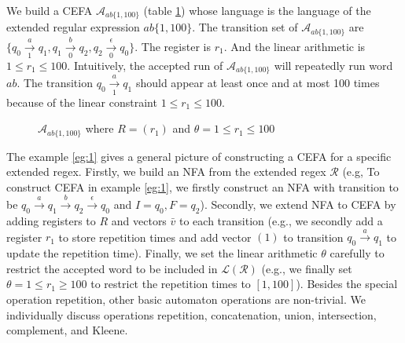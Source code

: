 \documentclass[sigconf]{acmart}
\newcommand*{\regex}{\mathcal{R}}
\newcommand*{\lan}{\mathcal{L}}
\newcommand*{\aut}{\mathcal{A}}
\begin{document}
\begin{example}[The CEFA  $\aut_{ab\{1,100\}}$ ] \label{eg:1}
  We build a CEFA $\aut_{ab\{1,100\}}$ (table \ref{fig:cefa1}) whose language is the language of the extended regular expression $ab\{1,100\}$. The transition set of $\aut_{ab\{1,100\}}$ are $\{q_0\xrightarrow[1]{a} q_1, q_1 \xrightarrow[0]{b} q_2, q_2 \xrightarrow[0]{\epsilon} q_0\}$. The register is $r_1$. And the linear arithmetic is $1\leq r_1\leq 100$. Intuitively, the accepted run of $\aut_{ab\{1,100\}}$ will repeatedly run word $ab$. The transition $q_0\xrightarrow[1]{a} q_1$ should appear at least once and at most 100 times because of the linear constraint $1\leq r_1 \leq 100$.
  \begin{figure}[h]
    \caption{$\aut_{ab\{1,100\}}$ where $R=(r_1)$ and $\theta = 1\leq r_1 \leq 100$}
    \label{fig:cefa1}
  \end{figure}
\end{example}
The example \ref{eg:1} gives a general picture of constructing a CEFA for a specific extended regex. Firstly, we build an NFA from the extended regex $\regex$
(e.g, To construct CEFA in example \ref{eg:1}, we firstly construct an NFA with
transition to be $q_0\xrightarrow{a} q_1\xrightarrow{b}q_2\xrightarrow{\epsilon}
  q_0$ and $I={q_0}, F={q_2}$). Secondly, we extend NFA to CEFA by adding
registers to $R$ and vectors $\bar{v}$ to each transition (e.g., we secondly add a
register $r_1$ to store repetition times and add vector $(1)$ to transition
$q_0\xrightarrow{a}q_1$ to update the repetition time). Finally, we set the
linear arithmetic $\theta$ carefully to restrict the accepted word to be
included in $\lan(\regex)$ (e.g., we finally set $\theta = 1\leq r_1\geq 100$ to
restrict the repetition times to $[1,100]$). Besides the special
operation repetition, other basic automaton operations are non-trivial. We individually discuss operations repetition, concatenation,
union, intersection, complement, and Kleene.
\end{document}
